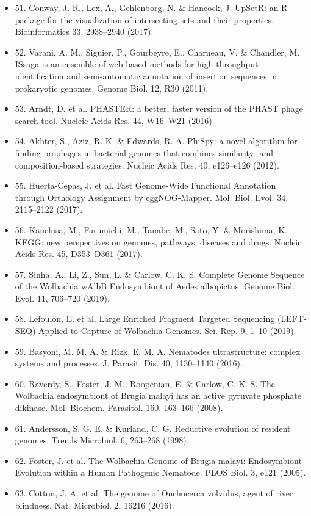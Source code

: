 \documentclass[10pt, a4paper, twocolumn]{article} %
\begin{document}
\begin{itemize}
\item 51.	Conway, J. R., Lex, A., Gehlenborg, N. \& Hancock, J. UpSetR: an R package for the visualization of intersecting sets and their properties. Bioinformatics 33, 2938–2940 (2017).
\item 52.	Varani, A. M., Siguier, P., Gourbeyre, E., Charneau, V. \& Chandler, M. ISsaga is an ensemble of web-based methods for high throughput identification and semi-automatic annotation of insertion sequences in prokaryotic genomes. Genome Biol. 12, R30 (2011).
\item 53.	Arndt, D. et al. PHASTER: a better, faster version of the PHAST phage search tool. Nucleic Acids Res. 44, W16–W21 (2016).
\item 54.	Akhter, S., Aziz, R. K. \& Edwards, R. A. PhiSpy: a novel algorithm for finding prophages in bacterial genomes that combines similarity- and composition-based strategies. Nucleic Acids Res. 40, e126–e126 (2012).
\item 55.	Huerta-Cepas, J. et al. Fast Genome-Wide Functional Annotation through Orthology Assignment by eggNOG-Mapper. Mol. Biol. Evol. 34, 2115–2122 (2017).
\item 56.	Kanehisa, M., Furumichi, M., Tanabe, M., Sato, Y. \& Morishima, K. KEGG: new perspectives on genomes, pathways, diseases and drugs. Nucleic Acids Res. 45, D353–D361 (2017).
\item 57.	Sinha, A., Li, Z., Sun, L. \& Carlow, C. K. S. Complete Genome Sequence of the Wolbachia wAlbB Endosymbiont of Aedes albopictus. Genome Biol. Evol. 11, 706–720 (2019).
\item 58.	Lefoulon, E. et al. Large Enriched Fragment Targeted Sequencing (LEFT-SEQ) Applied to Capture of Wolbachia Genomes. Sci. Rep. 9, 1–10 (2019).
\item 59.	Basyoni, M. M. A. \& Rizk, E. M. A. Nematodes ultrastructure: complex systems and processes. J. Parasit. Dis. 40, 1130–1140 (2016).
\item 60.	Raverdy, S., Foster, J. M., Roopenian, E. \& Carlow, C. K. S. The Wolbachia endosymbiont of Brugia malayi has an active pyruvate phosphate dikinase. Mol. Biochem. Parasitol. 160, 163–166 (2008).
\item 61.	Andersson, S. G. E. \& Kurland, C. G. Reductive evolution of resident genomes. Trends Microbiol. 6, 263–268 (1998).
\item 62.	Foster, J. et al. The Wolbachia Genome of Brugia malayi: Endosymbiont Evolution within a Human Pathogenic Nematode. PLOS Biol. 3, e121 (2005).
\item 63.	Cotton, J. A. et al. The genome of Onchocerca volvulus, agent of river blindness. Nat. Microbiol. 2, 16216 (2016).

\end{itemize}
\end{document}
